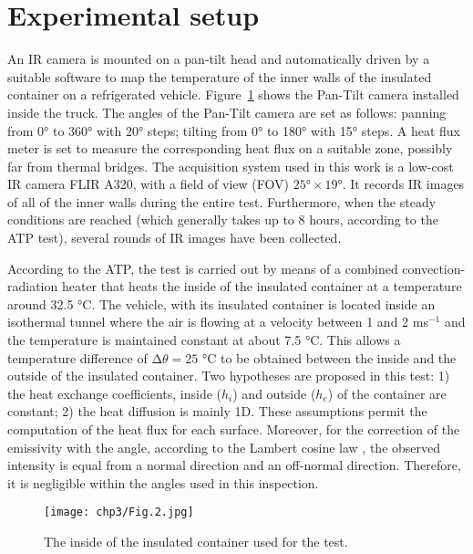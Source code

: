 \section{Experimental setup}
An IR camera is mounted on a pan-tilt head and automatically driven by a suitable software to map the temperature of the inner walls of the insulated container on a refrigerated vehicle. Figure~\ref{Exp_setup} shows the Pan-Tilt camera installed inside the truck. The angles of the Pan-Tilt camera are set as follows: panning from 0° to 360° with 20° steps; tilting from 0° to 180° with 15° steps. A heat flux meter is set to measure the corresponding heat flux on a suitable zone, possibly far from thermal bridges. The acquisition system used in this work is a low-cost IR camera FLIR A320, with a field of view (FOV) $ 25°×19° $. It records IR images of all of the inner walls during the entire test. Furthermore, when the steady conditions are reached (which generally takes up to 8 hours, according to the ATP test), several rounds of IR images have been collected.

According to the ATP, the test is carried out by means of a combined convection-radiation heater that heats the inside of the insulated container at a temperature around 32.5 °C. The vehicle, with its insulated container is located inside an isothermal tunnel where the air is flowing at a velocity between 1 and 2 ms$^{−1}$ and the temperature is maintained constant at about 7.5 °C. This allows a temperature difference of $ ∆\theta  = 25 $ °C to be obtained between the inside and the outside of the insulated container. Two hypotheses are proposed in this test: 1) the heat exchange coefficients, inside ($ h_i $) and outside ($ h_e $) of the container are constant; 2) the heat diffusion is mainly 1D. These assumptions permit the computation of the heat flux for each surface. Moreover, for the correction of the emissivity with the angle, according to the Lambert cosine law \citet{dragano2009experimental,Hottel1967a}, the observed intensity is equal from a normal direction and an off-normal direction. Therefore, it is negligible within the angles used  in this inspection.
\begin{figure}[ht]
    \centering
    \texttt{[image: chp3/Fig.2.jpg]}
    \caption{The inside of the insulated container used for the test.}
    \label{Exp_setup}
\end{figure}


